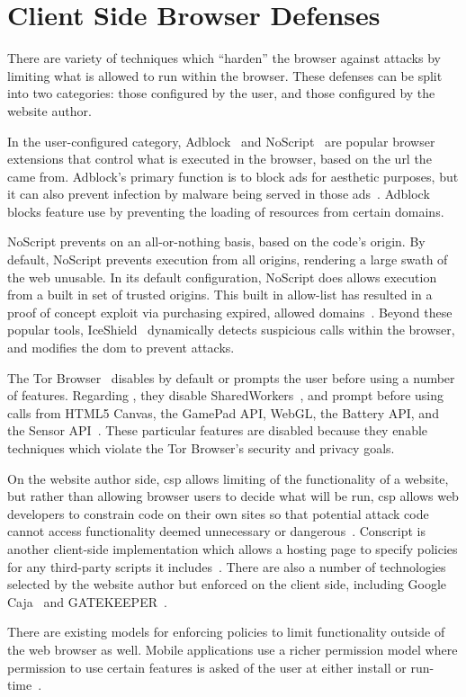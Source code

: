 \section{Client Side Browser Defenses}
\label{background:related-browser-defs}

There are variety of techniques which ``harden'' the browser against attacks
by limiting what \JS is allowed to run within the browser. These defenses can
be split into two categories: those configured by the user, and those
configured by the website author.

In the user-configured category, Adblock~\cite{adblockplus} and
NoScript~\cite{noscriptwebsite} are popular browser
extensions that control what \JS is executed in the browser, based on the
\gls{url} the \JS came from.  Adblock's primary
function is to block ads for aesthetic purposes, but it can also prevent
infection by malware being served in those
ads~\cite{forbes-malware,engadget-malware}.  Adblock blocks feature use by
preventing the loading of resources from certain domains.

NoScript prevents \JS on an
all-or-nothing basis, based on the code's origin.  By default, NoScript prevents
\JS execution from all origins, rendering a large swath of the web unusable.  
In its default configuration, NoScript does allows \JS execution from a built
in set of trusted origins.  This built in allow-list has resulted in a proof of
concept exploit via purchasing expired, allowed domains~\cite{noscript_whitelist}.
Beyond these popular tools, IceShield~\cite{heiderich2011iceshield}
dynamically detects suspicious \JS calls within the browser, and modifies the
\gls{dom} to prevent attacks.

The Tor Browser~\cite{dingledine2004tor} disables by default or prompts the
user before using a number of features.  Regarding \JS, they disable
SharedWorkers~\cite{webworkersw3c}, and prompt before using calls from HTML5
Canvas, the GamePad API, WebGL, the Battery API, and the Sensor
API~\cite{tor-features}.  These particular features are disabled because they
enable techniques which violate the Tor Browser's security and privacy goals.

On the website author side, \gls{csp} allows limiting of the
functionality of a website, but rather than allowing browser users to decide
what will be run, \gls{csp} allows web developers to constrain code on their own
sites so that potential attack code cannot access functionality deemed
unnecessary or dangerous~\cite{stamm2010reining}.  Conscript is another
client-side implementation which allows a hosting page to specify policies for
any third-party scripts it includes~\cite{meyerovich2010conscript}.  There are
also a number of technologies selected by the website author but enforced on
the client side,  including Google Caja~\cite{google13caja} and
GATEKEEPER~\cite{guarnieri09gatekeeper}.

There are existing models for enforcing policies to limit functionality outside
of the web browser as well.  Mobile applications use a richer permission model
where permission to use certain features is asked of the user at either install
or run-time~\cite{android-permissions,au2011short}.
